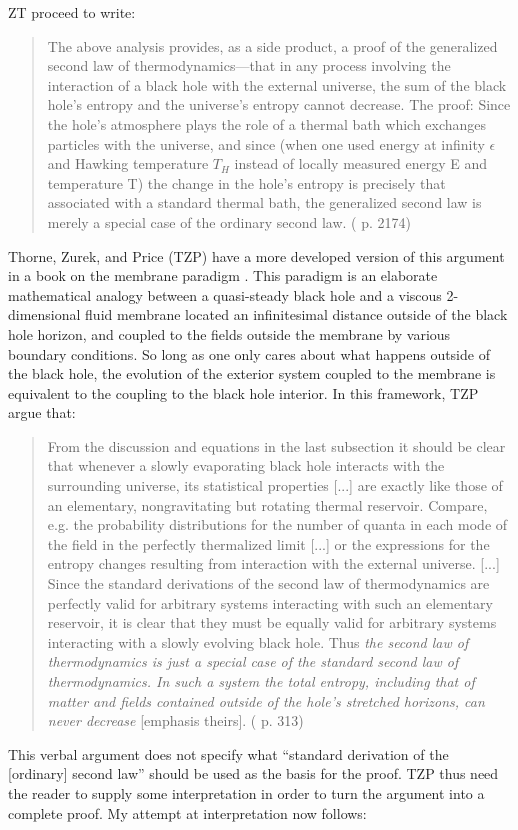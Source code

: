 \documentclass{article}
\begin{document}
ZT proceed to write:
\begin{quote}\small
The above analysis provides, as a side product, a proof of the generalized second law of thermodynamics---that in any process involving the interaction of a black hole with the external universe, the sum of the black hole's entropy and the universe's entropy cannot decrease.  The proof: Since the hole's atmosphere plays the role of a thermal bath which exchanges particles with the universe, and since (when one used energy at infinity $\epsilon$ and Hawking temperature $T_{H}$ instead of locally measured energy E and temperature T) the change in the hole's entropy is precisely that associated with a standard thermal bath, the generalized second law is merely a special case of the ordinary second law.  (\cite{ZT85} p. 2174)
\end{quote}
Thorne, Zurek, and Price (TZP) have a more developed version of this argument in a book on the membrane paradigm \cite{TZP86}.  This paradigm is an elaborate mathematical analogy between a quasi-steady black hole and a viscous 2-dimensional fluid membrane located an infinitesimal distance outside of the black hole horizon, and coupled to the fields outside the membrane by various boundary conditions.  So long as one only cares about what happens outside of the black hole, the evolution of the exterior system coupled to the membrane is equivalent to the coupling to the black hole interior.  In this framework, TZP argue that:
\begin{quote}\small
From the discussion and equations in the last subsection it should be clear that whenever a slowly evaporating black hole interacts with the surrounding universe, its statistical properties [...] are exactly like those of an elementary, nongravitating but rotating thermal reservoir.  Compare, e.g. the probability distributions for the number of quanta in each mode of the field in the perfectly thermalized limit [...] or the expressions for the entropy changes resulting from interaction with the external universe. [...] Since the standard derivations of the second law of thermodynamics are perfectly valid for arbitrary systems interacting with such an elementary reservoir, it is clear that they must be equally valid for arbitrary systems interacting with a slowly evolving black hole.  Thus \emph{the second law of thermodynamics is just a special case of the standard second law of thermodynamics.  In such a system the total entropy, including that of matter and fields contained outside of the hole's stretched horizons, can never decrease} [emphasis theirs].  (\cite{TZP86} p. 313)
\end{quote}
This verbal argument does not specify what ``standard derivation of the [ordinary] second law'' should be used as the basis for the proof.  TZP thus need the reader to supply some interpretation in order to turn the argument into a complete proof.  My attempt at interpretation now follows:
\end{document}
